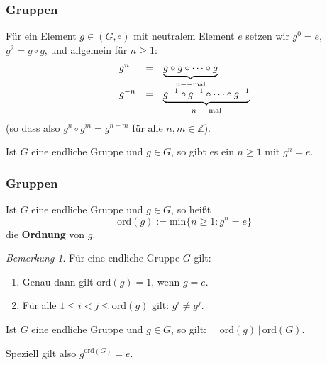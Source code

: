 \documentclass[hyperref={pdfpagelabels=false}]{beamer}
\theoremstyle{plain}%
\theoremstyle{definition}
\theoremstyle{remark}
\newtheorem*{notiz}{Bemerkung}
\begin{document}
\begin{frame}
\frametitle{Gruppen}

Für ein Element $g \in (G, \circ)$ mit neutralem Element $e$ setzen wir $g^0 = e$, $g^2 = g \circ g$, und 
allgemein für $n \geq 1$:
  	$$ \begin{array} {l c l}
  	g^n & = & \underbrace{g \circ g \circ \cdots \circ g}_{n--\textrm{mal}} \\
  	g^{-n} & = & \underbrace{g^{-1} \circ g^{-1} \circ \cdots \circ g^{-1}}_{n--\textrm{mal}}
  	\end{array} $$
(so dass also $g^n \circ g^m = g^{n+m}$ für alle $n, m \in \mathbb Z$). 

\pause

\begin{lemma}\label{gruppe_endl_ordnung1} Ist $G$ eine endliche Gruppe und $g \in G$, so gibt es ein $n \geq 1$ 
mit $g^n = e$.
\end{lemma}

\end{frame}

\begin{frame}
\frametitle{Gruppen}

\begin{definition} Ist $G$ eine endliche Gruppe und $g \in G$, so heißt 
\vspace{-0.1cm}
  	$$ \mathrm{ord}(g) := \textrm{min} \{ n \geq 1: g^n = e \} $$
\vspace{-0.1cm}
die \textbf{Ordnung} von $g$.
\end{definition}

\pause

\begin{notiz} Für eine endliche Gruppe $G$ gilt: 

\begin{enumerate}
\item<3-> Genau dann gilt $\mathrm{ord}(g) = 1$, wenn $g = e$.
\item<4-> Für alle $1 \leq i < j \leq \mathrm{ord}(g)$ gilt: $g^i \neq g^j$.
\end{enumerate}
\end{notiz} 

\pause \pause \pause 

\begin{lemma} Ist $G$ eine endliche Gruppe und $g \in G$, so gilt: $\quad \mathrm{ord}(g) \, \vert \, \mathrm{ord}(G)$. 

\pause \medbreak
Speziell gilt also $ g^{\mathrm{ord}(G)} = e$.
\end{lemma}

\end{frame}
\end{document}
